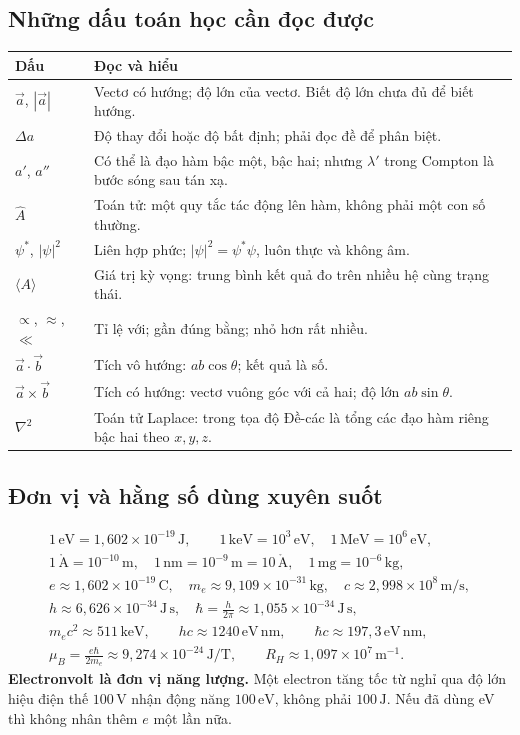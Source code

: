 \documentclass[11pt,a4paper]{article}
\newcommand{\unit}[1]{\,\mathrm{#1}}
\begin{document}
\subsection{Những dấu toán học cần đọc được}
\begin{tabularx}{\textwidth}{@{}Q{3cm}Y@{}}
\toprule
\textbf{Dấu} & \textbf{Đọc và hiểu}\\\midrule
$\vec a$, $|\vec a|$ & Vectơ có hướng; độ lớn của vectơ. Biết độ lớn chưa đủ để biết hướng.\\
$\Delta a$ & Độ thay đổi hoặc độ bất định; phải đọc đề để phân biệt.\\
$a'$, $a''$ & Có thể là đạo hàm bậc một, bậc hai; nhưng $\lambda'$ trong Compton là bước sóng sau tán xạ.\\
$\hat A$ & Toán tử: một quy tắc tác động lên hàm, không phải một con số thường.\\
$\psi^*$, $|\psi|^2$ & Liên hợp phức; $|\psi|^2=\psi^*\psi$, luôn thực và không âm.\\
$\langle A\rangle$ & Giá trị kỳ vọng: trung bình kết quả đo trên nhiều hệ cùng trạng thái.\\
$\propto$, $\approx$, $\ll$ & Tỉ lệ với; gần đúng bằng; nhỏ hơn rất nhiều.\\
$\vec a\cdot\vec b$ & Tích vô hướng: $ab\cos\theta$; kết quả là số.\\
$\vec a\times\vec b$ & Tích có hướng: vectơ vuông góc với cả hai; độ lớn $ab\sin\theta$.\\
$\nabla^2$ & Toán tử Laplace: trong tọa độ Đề-các là tổng các đạo hàm riêng bậc hai theo $x,y,z$.\\
\bottomrule
\end{tabularx}

\subsection{Đơn vị và hằng số dùng xuyên suốt}\label{sec:units}
\[
\begin{gathered}
1\unit{eV}=1{,}602\times10^{-19}\unit{J},\qquad
1\unit{keV}=10^3\unit{eV},\quad 1\unit{MeV}=10^6\unit{eV},\\
1\unit{\mathring A}=10^{-10}\unit m,\quad
1\unit{nm}=10^{-9}\unit m=10\unit{\mathring A},\quad
1\unit{mg}=10^{-6}\unit{kg},\\
e\approx1{,}602\times10^{-19}\unit C,\quad
m_e\approx9{,}109\times10^{-31}\unit{kg},\quad
c\approx2{,}998\times10^8\unit{m/s},\\
h\approx6{,}626\times10^{-34}\unit{J\,s},\quad
\hbar=\frac h{2\pi}\approx1{,}055\times10^{-34}\unit{J\,s},\\
m_ec^2\approx511\unit{keV},\qquad
hc\approx1240\unit{eV\,nm},\qquad
\hbar c\approx197{,}3\unit{eV\,nm},\\
\mu_B=\frac{e\hbar}{2m_e}\approx9{,}274\times10^{-24}\unit{J/T},\qquad
R_H\approx1{,}097\times10^7\unit{m^{-1}}.
\end{gathered}
\]
\textbf{Electronvolt là đơn vị năng lượng.} Một electron tăng tốc từ nghỉ
qua độ lớn hiệu điện thế $100\unit V$ nhận động năng $100\unit{eV}$,
không phải $100\unit J$. Nếu đã dùng eV thì không nhân thêm $e$ một lần nữa.
\end{document}
